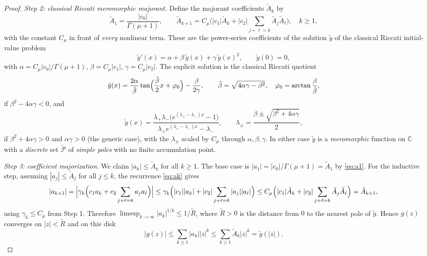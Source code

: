 \documentclass[11pt]{article}
\theoremstyle{definition}
\theoremstyle{remark}
\begin{document}
\begin{proof}
\emph{Step 2: classical Riccati meromorphic majorant.} Define the majorant coefficients $\tilde A_{k}$ by
\begin{equation}
\tilde A_{1}=\frac{|c_{0}|}{\Gamma(\mu+1)},
\qquad
\tilde A_{k+1}=C_{\mu}\biggl(|c_{1}|\tilde A_{k}+|c_{2}|\!\!\sum_{j+\ell=k}\!\!\tilde A_{j}\tilde A_{\ell}\biggr),
\quad k\ge 1,
\label{eq:majorant-coeff}
\end{equation}
with the constant $C_{\mu}$ in front of \emph{every} nonlinear term. These are the power-series coefficients of the solution $\tilde y$ of the classical Riccati initial-value problem
\begin{equation}
\tilde y'(x)=\alpha+\beta\,\tilde y(x)+\gamma\,\tilde y(x)^{2},
\qquad \tilde y(0)=0,
\label{eq:majorant-ode}
\end{equation}
with $\alpha=C_{\mu}|c_{0}|/\Gamma(\mu+1)$, $\beta=C_{\mu}|c_{1}|$, $\gamma=C_{\mu}|c_{2}|$. The explicit solution is the classical Riccati quotient
\begin{equation}
\tilde y(x)=\frac{2\alpha}{\hat\beta}\tan\Bigl(\frac{\hat\beta}{2}x+\varphi_{0}\Bigr)-\frac{\beta}{2\gamma},
\qquad \hat\beta=\sqrt{4\alpha\gamma-\beta^{2}},\quad \varphi_{0}=\arctan\frac{\beta}{\hat\beta},
\label{eq:majorant-tan}
\end{equation}
if $\beta^{2}-4\alpha\gamma<0$, and
\begin{equation}
\tilde y(x)=\frac{\lambda_{+}\lambda_{-}\bigl(e^{(\lambda_{+}-\lambda_{-})x}-1\bigr)}{\lambda_{+}e^{(\lambda_{+}-\lambda_{-})x}-\lambda_{-}},
\qquad \lambda_{\pm}=\frac{\beta\pm\sqrt{\beta^{2}+4\alpha\gamma}}{2},
\label{eq:majorant-exp}
\end{equation}
if $\beta^{2}+4\alpha\gamma>0$ and $\alpha\gamma>0$ (the generic case), with the $\lambda_{\pm}$ scaled by $C_{\mu}$ through $\alpha,\beta,\gamma$. In either case $\tilde y$ is a \emph{meromorphic} function on $\mathbb{C}$ with a \emph{discrete} set $\widetilde{\mathcal{P}}$ of \emph{simple poles} with no finite accumulation point.

\emph{Step 3: coefficient majorization.} We claim $|a_{k}|\le\tilde A_{k}$ for all $k\ge 1$. The base case is $|a_{1}|=|c_{0}|/\Gamma(\mu+1)=\tilde A_{1}$ by \eqref{eq:a1}. For the inductive step, assuming $|a_{j}|\le\tilde A_{j}$ for all $j\le k$, the recurrence \eqref{eq:ak} gives
\begin{equation}
|a_{k+1}|
=\Bigl|\gamma_{k}\Bigl(c_{1}a_{k}+c_{2}\sum_{j+\ell=k}a_{j}a_{\ell}\Bigr)\Bigr|
\le\gamma_{k}\Bigl(|c_{1}||a_{k}|+|c_{2}|\sum_{j+\ell=k}|a_{j}||a_{\ell}|\Bigr)
\le C_{\mu}\Bigl(|c_{1}|\tilde A_{k}+|c_{2}|\sum_{j+\ell=k}\tilde A_{j}\tilde A_{\ell}\Bigr)
=\tilde A_{k+1},
\label{eq:majorization-step}
\end{equation}
using $\gamma_{k}\le C_{\mu}$ from Step 1. Therefore $\limsup_{k\to\infty}|a_{k}|^{1/k}\le 1/\tilde R$, where $\tilde R>0$ is the distance from $0$ to the nearest pole of $\tilde y$. Hence $g(z)$ converges on $|z|<\tilde R$ and on this disk
\begin{equation}
|g(z)|\le\sum_{k\ge 1}|a_{k}||z|^{k}\le\sum_{k\ge 1}\tilde A_{k}|z|^{k}=\tilde y(|z|).
\label{eq:majorant-bound}
\end{equation}


\end{proof}
\end{document}
